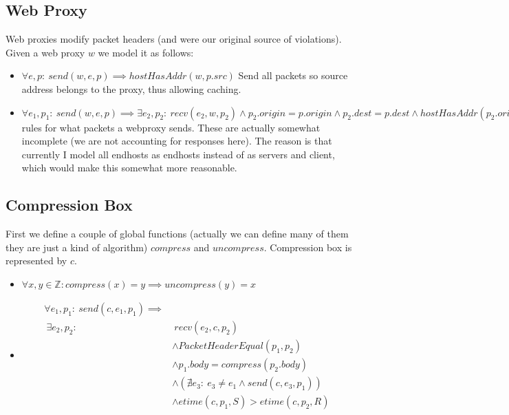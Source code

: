 \subsection{Web Proxy}
Web proxies modify packet headers (and were our original source of violations). Given a web proxy $w$ we model it as
follows:
\begin{itemize}
\item $\forall e, p:\ send(w, e, p) \implies hostHasAddr(w, p.src)$ Send all packets so source address belongs to the
proxy, thus allowing caching.
\item $\forall e_1, p_1:\ send(w, e, p) \implies \exists e_2, p_2:\ recv(e_2, w, p_2) \land p_2.origin = p.origin \land
p_2.dest = p.dest \land hostHasAddr(p_2.origin, p_2.src) \land etime(w, p_1, S) \geq etime(w, p_1, R)$ rules for what
packets a webproxy sends. These are actually somewhat incomplete (we are not accounting for responses here). The
reason is that currently I model all endhosts as endhosts instead of as servers and client, which would make this
somewhat more reasonable.
\end{itemize}

\subsection{Compression Box}
First we define a couple of global functions (actually we can define many of them they are just a kind of algorithm)
$compress$ and $uncompress$. Compression box is represented by $c$.

\begin{itemize}
    \item $\forall x, y \in \mathbb{Z}: compress(x) = y \implies uncompress(y) = x$
    \item 
        \begin{align*}
            \forall e_1, p_1:\ send(c, e_1, p_1) \implies\\
            \ \exists e_2, p_2:&\  recv(e_2, c, p_2)\\
                               &\land PacketHeaderEqual(p_1, p_2)\\
                               &\land p_1.body = compress(p_2.body)\\
                               &\land \left(\nexists e_3:\ e_3 \neq e_1 \land send(c, e_3, p_1)\right)\\
                               &\land etime(c, p_1, S) > etime(c, p_2, R)
        \end{align*}
\end{itemize}

